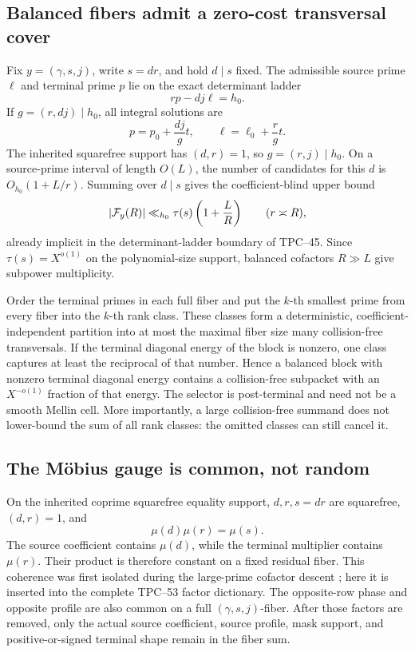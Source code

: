 \subsection{Balanced fibers admit a zero-cost transversal cover}

Fix \(y=(\gamma,s,j)\), write \(s=dr\), and hold \(d\mid s\) fixed.  The
admissible source prime \(\ell\) and terminal prime \(p\) lie on the exact
determinant ladder
\[
 rp-dj\ell=h_0.
\]
If \(g=(r,dj)\mid h_0\), all integral solutions are
\[
 p=p_0+\frac{dj}{g}t,
 \qquad
 \ell=\ell_0+\frac r g t.
\]
The inherited squarefree support has \((d,r)=1\), so \(g=(r,j)\mid h_0\).
On a source-prime interval of length \(O(L)\), the number of candidates for
this \(d\) is \(O_{h_0}(1+L/r)\).  Summing over \(d\mid s\) gives the
coefficient-blind upper bound
\[
 |\mathcal F_y(R)|
 \ll_{h_0}\tau(s)\left(1+\frac LR\right)
 \qquad(r\asymp R),
\]
already implicit in the determinant-ladder boundary of TPC--45.  Since
\(\tau(s)=X^{o(1)}\) on the polynomial-size support, balanced cofactors
\(R\gg L\) give subpower multiplicity.

Order the terminal primes in each full fiber and put the \(k\)-th smallest
prime from every fiber into the \(k\)-th rank class.  These classes form a
deterministic, coefficient-independent partition into at most the maximal
fiber size many collision-free transversals.  If the terminal diagonal
energy of the block is nonzero, one class captures at least the reciprocal
of that number.  Hence a balanced block with nonzero terminal diagonal
energy contains a collision-free subpacket with an \(X^{-o(1)}\) fraction
of that energy.  The selector is post-terminal and need not be a smooth
Mellin cell.  More importantly, a large collision-free summand does not
lower-bound the sum of all rank classes: the omitted classes can still
cancel it.

\subsection{The M\"obius gauge is common, not random}

On the inherited coprime squarefree equality support,
\(d,r,s=dr\) are squarefree, \((d,r)=1\), and
\[
 \mu(d)\mu(r)=\mu(s).
\]
The source coefficient contains \(\mu(d)\), while the terminal multiplier
contains \(\mu(r)\).  Their product is therefore constant on a fixed
residual fiber.  This coherence was first isolated during the large-prime
cofactor descent \citep{WangTPC45}; here it is inserted into the complete
TPC--53 factor dictionary.  The opposite-row phase and opposite profile
are also common on a full \((\gamma,s,j)\)-fiber.  After those factors are
removed, only the actual source coefficient, source profile, mask support,
and positive-or-signed terminal shape remain in the fiber sum.

